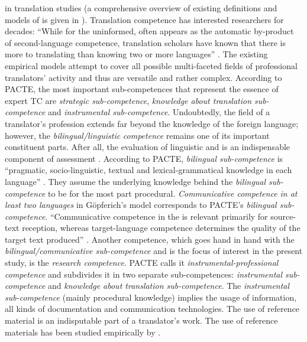 \documentclass[output=paper]{langsci/langscibook.cls}
\begin{document}
in translation studies (a comprehensive overview of existing definitions and models of  is given in \citealt{Gopferich2008, Herold2010}).  Translation competence has interested researchers for decades: ``While for the uninformed,  often appears as the automatic by-product of second-language competence, translation scholars have known that there is more to translating than knowing two or more languages'' \citep[174]{Gopferich2009Process}. The existing empirical  models attempt to cover all possible multi-faceted fields of professional translators' activity and thus are versatile and rather complex. According to PACTE, the most important sub-competences that represent the essence of expert TC are \textit{strategic sub-competence}, \textit{knowledge about translation sub-competence} and \textit{instrumental sub-competence}. Undoubtedly, the field of a translator's profession extends far beyond the knowledge of the foreign language; however, the \textit{bilingual/linguistic} \textit{competence} remains one of its important constituent parts. After all, the evaluation of linguistic and  is an indispensable component of  assessment \citep[199]{Mertin2006}. According to PACTE, \textit{bilingual sub-competence} is ``pragmatic, socio-linguistic, textual and lexical-grammatical knowledge in each language'' \citep[610]{PACTE2005Investigating}. They assume the underlying knowledge behind the \textit{bilingual sub-}\textit{competence} to be for the most part procedural. \textit{Communicative competence} \textit{in at least two languages} in Göpferich's  model corresponds to PACTE's \textit{bilingual sub-competence}. ``Communicative competence in the  is relevant primarily 
for source-text reception, whereas target-language competence determines the quality of the target text produced'' \citep[21]{Gopferich2009Towards}. Another competence, which goes hand in hand with the \textit{bilingual/communicative sub-competence} and is the focus of interest in the present study, is the \textit{research competence}. PACTE calls it \textit{instrumental-professional competence} and subdivides it in two separate sub-competences: \textit{instrumental sub-competence} and \textit{knowledge about translation sub-competence}. The \textit{instrumental sub-competence} (mainly procedural knowledge) implies the usage of information, all kinds of documentation and communication technologies. The use of reference material is an indisputable part of a translator's work. The use of reference materials has been studied empirically by \citet{Krings1986Was, Jaaskelainen1989, Livbjerg2002}.
\end{document}
